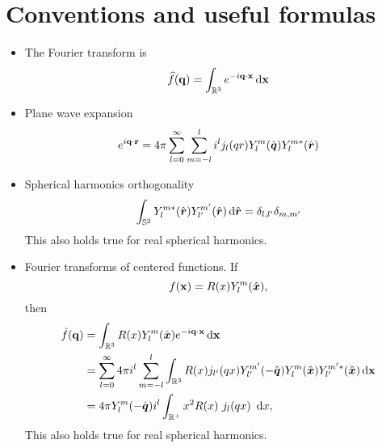 \documentclass[a4paper]{article}
\begin{document}
\section{Conventions and useful formulas}
\begin{itemize}
\item The Fourier transform is
  \begin{align*}
    \widehat{f}(\mathbf{q}) = \int_{\mathbb{R}^{3}} e^{-i\mathbf{q} \cdot \mathbf{x}} \mathop{}\!\mathrm{d}\mathbf{x}
  \end{align*}
\item Plane wave expansion
  \begin{align*}
    e^{i \mathbf{q} \cdot \mathbf{r}} =
  4 \pi \sum_{l = 0}^\infty \sum_{m = -l}^l
  i^l j_l(q r) Y_l^m(\hat{{\boldsymbol{q}}}) Y_l^{m\ast}(\hat{{\boldsymbol{r}}})
\end{align*}
\item Spherical harmonics orthogonality
  \[
    \int_{\mathbb{S}^2} Y_l^{m*}(\hat{{\boldsymbol{r}}})Y_{l'}^{m'}(\hat{{\boldsymbol{r}}}) \mathop{}\!\mathrm{d} \hat{{\boldsymbol{r}}}
  = \delta_{l,l'} \delta_{m,m'}
\]
This also holds true for real spherical harmonics.

\item Fourier transforms of centered functions.
If 
\[ f(\mathbf{x}) = R(x) Y_l^m(\hat{{\boldsymbol{x}}}),\]
then
\begin{align*}
  \hat f(\mathbf{q})
  &= \int_{\mathbb{R}^3} R(x) Y_{l}^{m}(\hat{{\boldsymbol{x}}}) e^{-i \mathbf{q} \cdot \mathbf{x}} \mathop{}\!\mathrm{d}\mathbf{x} \\
  &= \sum_{l = 0}^\infty 4 \pi i^l 
  \sum_{m = -l}^l \int_{\mathbb{R}^3}
  R(x) j_{l'}(q x)Y_{l'}^{m'}(-\hat{{\boldsymbol{q}}}) Y_{l}^{m}(\hat{{\boldsymbol{x}}})
   Y_{l'}^{m'\ast}(\hat{{\boldsymbol{x}}})
  \mathop{}\!\mathrm{d}\mathbf{x} \\
  &= 4 \pi Y_{l}^{m}(-\hat{{\boldsymbol{q}}}) i^{l}
  \int_{\mathbb{R}^+} x^2 R(x) \ j_{l}(q x)
  \
   \mathop{}\!\mathrm{d} x,
 \end{align*}
This also holds true for real spherical harmonics.
\end{itemize}
\end{document}

